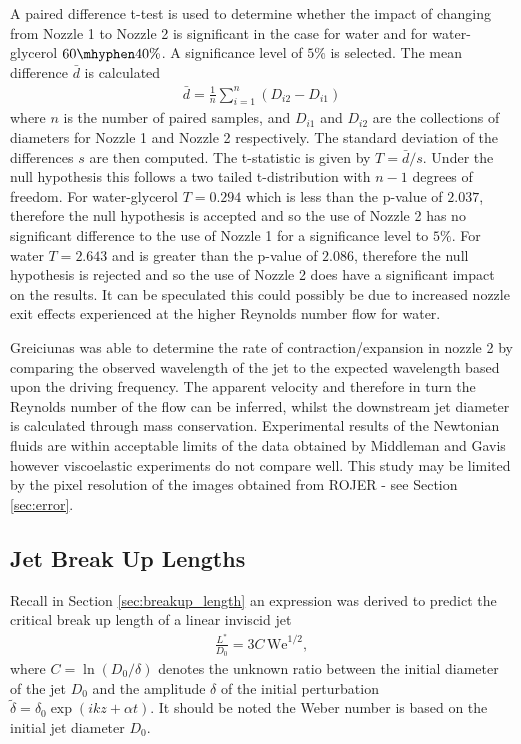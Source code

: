 \documentclass[11pt]{article}
\begin{document}
A paired difference t-test is used to determine whether the impact of changing from Nozzle 1 to Nozzle 2 is significant in the case for water and for water-glycerol $60 \mhyphen 40 \%$. A significance level of $5\%$ is selected. The mean difference $\bar{d}$ is calculated
\begin{align*}
\bar{d} = \frac{1}{n} \sum^n_{i=1} \left(D_{i2} - D_{i1} \right)
\end{align*}
where $n$ is the number of paired samples, and $D_{i1}$ and $D_{i2}$ are the collections of diameters for Nozzle 1 and Nozzle 2 respectively. The standard deviation of the differences $s$ are then computed. The t-statistic is given by
$T = \bar{d}/s$. Under the null hypothesis this follows a two tailed t-distribution with $n-1$ degrees of freedom. For water-glycerol $T = 0.294$ which is less than the p-value of $2.037$, therefore the null hypothesis is accepted and so the use of Nozzle 2 has no significant difference to the use of Nozzle 1 for a significance level to $5 \%$. For water $T = 2.643$ and is greater than the p-value of $2.086$, therefore the null hypothesis is rejected and so the use of Nozzle 2 does have a significant impact on the results. It can be speculated this could possibly be due to increased nozzle exit effects experienced at the higher Reynolds number flow for water. 

Greiciunas \cite{greiciunas2015report} was able to determine the rate of contraction/expansion in nozzle 2 by comparing the observed wavelength of the jet to the expected wavelength based upon the driving frequency. The apparent velocity and therefore in turn the Reynolds number of the flow can be inferred, whilst the downstream jet diameter is calculated through mass conservation. Experimental results of the Newtonian fluids are within acceptable limits of the data obtained by Middleman and Gavis \cite{middleman1961expansion} however viscoelastic experiments do not compare well. This study may be limited by the pixel resolution of the images obtained from ROJER - see Section \ref{sec:error}.

\subsection{Jet Break Up Lengths} \label{sec:exp_breakup}
Recall in Section \ref{sec:breakup_length} an expression was derived to predict the critical break up length of a linear inviscid jet
\begin{align}
\frac{L^*}{D_0} = 3C \, \mathrm{We}^{1/2},
\label{eqn:inviscid_breakup}
\end{align}
where $C = \ln \left( D_0 / \delta  \right)$ denotes the unknown ratio between the initial diameter of the jet $D_0$ and the amplitude $\delta$ of the initial perturbation $\tilde{\delta} = \delta_0 \exp (ikz + \alpha t)$. It should be noted the Weber number is based on the initial jet diameter $D_0$. 
\end{document}
